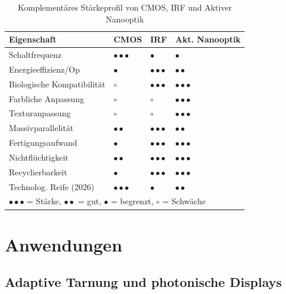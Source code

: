 ﻿\documentclass[a4paper,12pt]{scrreprt}
\theoremstyle{definition}
\begin{document}
\begin{table}[H]
  \centering
  \caption{Komplementäres Stärkeprofil von CMOS, IRF und Aktiver Nanooptik}
  \label{tab:vergleich}
  \begin{tabular}{p{4.5cm}p{3cm}p{3cm}p{3cm}}
    \toprule
    \textbf{Eigenschaft} & \textbf{CMOS} & \textbf{IRF} & \textbf{Akt. Nanooptik} \\
    \midrule
    Schaltfrequenz              & $\bullet\bullet\bullet$ & $\bullet$   & $\bullet$ \\
    Energieeffizienz/Op         & $\bullet$   & $\bullet\bullet\bullet$ & $\bullet\bullet$ \\
    Biologische Kompatibilität  & $\circ$     & $\bullet\bullet\bullet$ & $\bullet\bullet\bullet$ \\
    Farbliche Anpassung         & $\circ$     & $\circ$                 & $\bullet\bullet\bullet$ \\
    Texturanpassung             & $\circ$     & $\circ$                 & $\bullet\bullet\bullet$ \\
    Massivparallelität          & $\bullet\bullet$ & $\bullet\bullet\bullet$ & $\bullet\bullet$ \\
    Fertigungsaufwand           & $\bullet$   & $\bullet\bullet\bullet$ & $\bullet\bullet\bullet$ \\
    Nichtflüchtigkeit           & $\bullet\bullet$ & $\bullet\bullet\bullet$ & $\bullet\bullet\bullet$ \\
    Recyclierbarkeit            & $\bullet$   & $\bullet\bullet\bullet$ & $\bullet\bullet\bullet$ \\
    Technolog. Reife (2026)     & $\bullet\bullet\bullet$ & $\bullet$ & $\bullet\bullet$ \\
    \bottomrule
    \multicolumn{4}{l}{\small $\bullet\bullet\bullet$ = Stärke, $\bullet\bullet$ = gut, $\bullet$ = begrenzt, $\circ$ = Schwäche}
  \end{tabular}
\end{table}

\section{Anwendungen}

\subsection{Adaptive Tarnung und photonische Displays}
\end{document}
